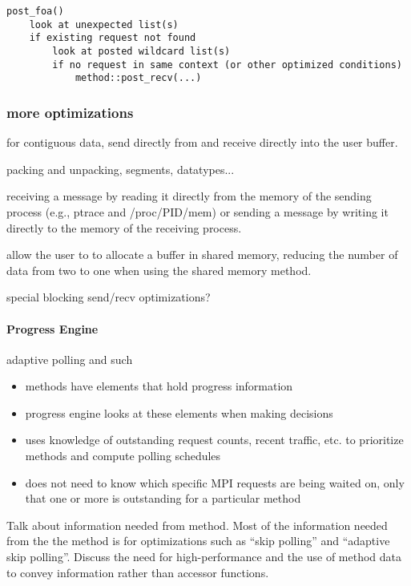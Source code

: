 \begin{verbatim}
post_foa()
    look at unexpected list(s)
    if existing request not found
        look at posted wildcard list(s)
        if no request in same context (or other optimized conditions)
            method::post_recv(...)
\end{verbatim}


\subsubsection{more optimizations}

for contiguous data, send directly from and receive directly into the
user buffer.

packing and unpacking, segments, datatypes...

receiving a message by reading it directly from the memory of the
sending process (e.g., ptrace and /proc/PID/mem) or sending a message
by writing it directly to the memory of the receiving process.

allow the user to  to allocate a buffer in shared
memory, reducing the number of data from two to one when using the
shared memory method.

special blocking send/recv optimizations?

\paragraph{Progress Engine} adaptive polling and such
\begin{itemize}
\item methods have elements that hold progress information
\item progress engine looks at these elements when making decisions
\item uses knowledge of outstanding request counts, recent traffic, etc. to
  prioritize methods and compute polling schedules
\item does not need to know which specific MPI requests are being waited
  on, only that one or more is outstanding for a particular method
\end{itemize}
  
\todo Talk about information needed from method.  Most of the information
needed from the the method is for optimizations such as ``skip polling'' and
``adaptive skip polling''.  Discuss the need for high-performance and the use
of method data to convey information rather than accessor functions.

